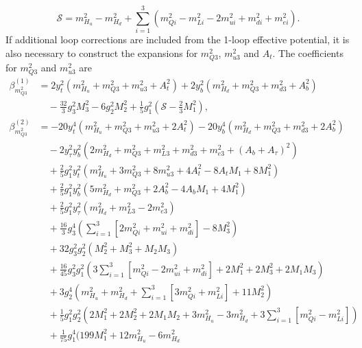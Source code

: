 \documentclass[preprint,amsmath,amssymb,aps,superscriptaddress,prd,showpacs,floatfix]{revtex4-1}
\begin{document}
\begin{equation}\label{eq:MSSMgaugeBetaContribution}
\mathcal{S}=m_{H_u}^2-m_{H_d}^2+\sum_{i=1}^3\left ( m_{Qi}^2-m_{Li}^2-2m_{ui}^2+m_{di}^2+m_{ei}^2\right ).
\end{equation}
If additional loop corrections are included from the 1-loop effective potential, it is also
necessary to construct the expansions for $m_{Q3}^2$, $m_{u3}^2$ and $A_t$. The coefficients for $m_{Q3}^2$ and
$m_{u3}^2$ are
\begin{subequations}\label{eq:MSSMmq32Betas}
\begin{align}
\beta_{m_{Q3}^2}^{(1)}&=2y_t^2\left ( m_{H_u}^2+m_{Q3}^2+m_{u3}^2+A_t^2\right )+2y_b^2\left ( m_{H_d}^2+m_{Q3}^2+m_{d3}^2+A_b^2\right )\\
&\quad{}-\frac{32}{3}g_3^2M_3^2-6g_2^2M_2^2+\frac{1}{5}g_1^2\left ( \mathcal{S}-\frac{2}{3}M_1^2\right ),\label{eq:MSSMmQ32beta1}\\
\beta_{m_{Q3}^2}^{(2)}&=-20y_t^4\left ( m_{H_u}^2+m_{Q3}^2+m_{u3}^2+2A_t^2\right )-20y_b^4\left ( m_{H_d}^2+m_{Q3}^2+m_{d3}^2+2A_b^2\right )\nonumber\\
&\quad{}-2y_\tau^2y_b^2\left ( 2m_{H_d}^2+m_{Q3}^2+m_{L3}^2+m_{d3}^2+m_{e3}^2+(A_b+A_\tau)^2\right )\nonumber\\
&\quad{}+\frac{2}{5}g_1^2y_t^2\left ( m_{H_u}^2+3m_{Q3}^2+8m_{u3}^2+4A_t^2-8A_tM_1+8M_1^2\right )\nonumber\\
&\quad{}+\frac{2}{5}g_1^2y_b^2\left ( 5m_{H_d}^2+m_{Q3}^2+2A_b^2-4A_bM_1+4M_1^2\right )\nonumber\\
&\quad{}+\frac{2}{5}g_1^2y_\tau^2\left ( m_{H_d}^2+m_{L3}^2-2m_{e3}^2\right )\nonumber\\
&\quad{}+\frac{16}{3}g_3^4\left ( \sum_{i=1}^3 \left [ 2m_{Qi}^2+m_{ui}^2+m_{di}^2\right ]-8M_3^2\right )\nonumber\\
&\quad{}+32g_3^2g_2^2\left ( M_2^2+M_3^2+M_2M_3\right )\nonumber\\
&\quad{}+\frac{16}{45}g_3^2g_1^2\left ( 3\sum_{i=1}^3\left [ m_{Qi}^2-2m_{ui}^2+m_{di}^2\right ]+2M_1^2+2M_3^2+2M_1M_3\right )\nonumber\\
&\quad{}+3g_2^4\left ( m_{H_u}^2+m_{H_d}^2+\sum_{i=1}^3\left [ 3m_{Qi}^2+m_{Li}^2\right ]+11M_2^2\right )\nonumber\\
&\quad{}+\frac{1}{5}g_1^2g_2^2\left ( 2M_1^2+2M_2^2+2M_1M_2+3m_{H_u}^2-3m_{H_d}^2+3\sum_{i=1}^3\left [ m_{Qi}^2-m_{Li}^2\right ]\right )\nonumber\\
&\quad{}+\frac{1}{75}g_1^4\bigg ( 199M_1^2+12m_{H_u}^2-6m_{H_d}^2\nonumber\\

\end{align}
\end{subequations}
\end{document}
